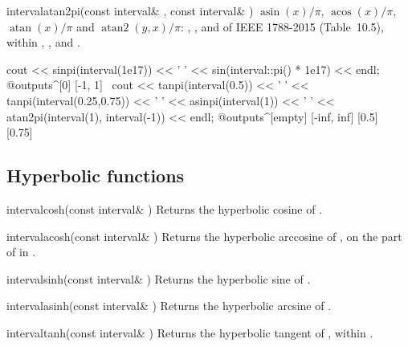 \documentclass[12pt,a4paper,twoside,openright]{book}
\begin{document}
\begin{deffun}{interval}{atan2pi}{(const interval\& , const interval\& )}
  $\operatorname{asin}(x)/\pi$, $\operatorname{acos}(x)/\pi$,
  $\operatorname{atan}(x)/\pi$ and $\operatorname{atan2}(y,x)/\pi$:
  , ,  and  of IEEE
  1788-2015 (Table~10.5), within , ,
   and .\newinvfive
\begin{example}
cout << sinpi(interval(1e17)) << ' '
     << sin(interval::pi() * 1e17) << endl;
@outputs^[0] [-1, 1]~
cout << tanpi(interval(0.5)) << ' '
     << tanpi(interval(0.25,0.75)) << ' '
     << asinpi(interval(1)) << ' '
     << atan2pi(interval(1), interval(-1)) << endl;
@outputs^[empty] [-inf, inf] [0.5] [0.75]~
\end{example}
\end{deffun}

\subsection{Hyperbolic functions}\label{sec:arithmetic-hyperbolic}
%

\begin{deffun}{interval}{cosh}{(const interval\& )}
  Returns the hyperbolic cosine of .
\end{deffun}

\begin{deffun}{interval}{acosh}{(const interval\& )}
  Returns the hyperbolic arccosine of , on the part of  in
  .
\end{deffun}

\begin{deffun}{interval}{sinh}{(const interval\& )}
  Returns the hyperbolic sine of .
\end{deffun}

\begin{deffun}{interval}{asinh}{(const interval\& )}
  Returns the hyperbolic arcsine of .
\end{deffun}

\begin{deffun}{interval}{tanh}{(const interval\& )}
  Returns the hyperbolic tangent of , within .
\end{deffun}
\end{document}
